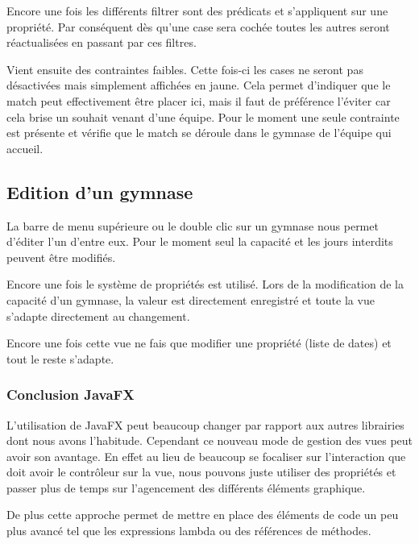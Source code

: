 \documentclass[final, noposter]{polytech/polytech}
\begin{document}
		Encore une fois les différents filtrer sont des prédicats et s'appliquent sur une propriété.
		Par conséquent dès qu'une case sera cochée toutes les autres seront réactualisées en passant par ces filtres.
		
		Vient ensuite des contraintes faibles.
		Cette fois-ci les cases ne seront pas désactivées mais simplement affichées en jaune.
		Cela permet d'indiquer que le match peut effectivement être placer ici, mais il faut de préférence l'éviter car cela brise un souhait venant d'une équipe.
		Pour le moment une seule contrainte est présente et vérifie que le match se déroule dans le gymnase de l'équipe qui accueil.
		
		\subsection{Edition d'un gymnase}
			La barre de menu supérieure ou le double clic sur un gymnase nous permet d'éditer l'un d'entre eux.
			Pour le moment seul la capacité et les jours interdits peuvent être modifiés.
			
			
			Encore une fois le système de propriétés est utilisé.
			Lors de la modification de la capacité d'un gymnase, la valeur est directement enregistré et toute la vue s'adapte directement au changement.
			
			
			Encore une fois cette vue ne fais que modifier une propriété (liste de dates) et tout le reste s'adapte.
			
		\subsubsection{Conclusion JavaFX}
			L'utilisation de JavaFX peut beaucoup changer par rapport aux autres librairies dont nous avons l'habitude.
			Cependant ce nouveau mode de gestion des vues peut avoir son avantage.
			En effet au lieu de beaucoup se focaliser sur l'interaction que doit avoir le contrôleur sur la vue, nous pouvons juste utiliser des propriétés et passer plus de temps sur l'agencement des différents éléments graphique.
			
			De plus cette approche permet de mettre en place des éléments de code un peu plus avancé tel que les expressions lambda ou des références de méthodes.
			
\end{document}
